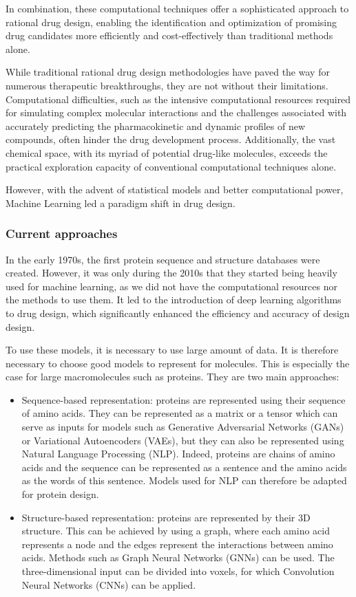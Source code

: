 In combination, these computational techniques offer a sophisticated approach to rational drug design, enabling the identification and optimization of promising drug candidates more efficiently and cost-effectively than traditional methods alone.

While traditional rational drug design methodologies have paved the way for numerous therapeutic breakthroughs, they are not without their limitations. Computational difficulties, such as the intensive computational resources required for simulating complex molecular interactions and the challenges associated with accurately predicting the pharmacokinetic and dynamic profiles of new compounds, often hinder the drug development process. Additionally, the vast chemical space, with its myriad of potential drug-like molecules, exceeds the practical exploration capacity of conventional computational techniques alone.

However, with the advent of statistical models and better computational power, Machine Learning led a paradigm shift in drug design.

\subsubsection{Current approaches}

In the early 1970s, the first protein sequence and structure databases were created. \cite{atlasprotein} However, it was only during the 2010s that they started being heavily used for machine learning, as we did not have the computational resources nor the methods to use them. It led to the introduction of deep learning algorithms to drug design, which significantly enhanced the efficiency and accuracy of design design. \cite{Ding2022ProteinDesign}

To use these models, it is necessary to use large amount of data. It is therefore necessary to choose good models to represent for molecules. This is especially the case for large macromolecules such as proteins. They are two main approaches: \cite{Defresne2021ProteinDesign}
\begin{itemize}
  \item Sequence-based representation: proteins are represented using their sequence of amino acids. They can be represented as a matrix or a tensor which can serve as inputs for models such as Generative Adversarial Networks (GANs) or Variational Autoencoders (VAEs), but they can also be represented using Natural Language Processing (NLP). Indeed, proteins are chains of amino acids and the sequence can be represented as a sentence and the amino acids as the words of this sentence. Models used for NLP can therefore be adapted for protein design.
  \item Structure-based representation: proteins are represented by their 3D structure. This can be achieved by using a graph, where each amino acid represents a node and the edges represent the interactions between amino acids. Methods such as Graph Neural Networks (GNNs) can be used. The three-dimensional input can be divided into voxels, for which Convolution Neural Networks (CNNs) can be applied.
\end{itemize}

